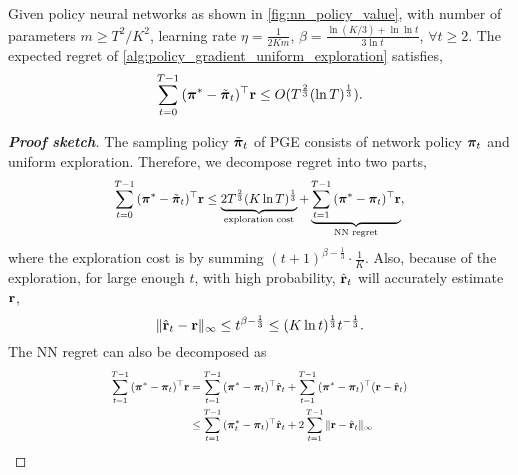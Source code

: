 \begin{thm}
	\label{thm:policy_gradient_main_result}
	Given policy neural networks as shown in \cref{fig:nn_policy_value}, with number of parameters $m \ge T^2 / K^2$, learning rate $\eta = \frac{1}{2 K m}$, $\beta = \frac{ \ln{(K/3) + \ln{\ln{t}} } }{ 3 \ln{t}}$, $\forall t \ge 2$. The expected regret of \cref{alg:policy_gradient_uniform_exploration} satisfies,
	\begin{equation*}
	\begin{split}
	\sum\limits_{t=0}^{T-1}{ ( {\boldsymbol{\pi}}^* - \tilde{{\boldsymbol{\pi}}}_t )^\top {\mathbf{r}}} \le O(T^{\frac{2}{3}}( \ln{T} )^{\frac{1}{3}}).
	\end{split}
	\end{equation*}
\end{thm}
\begin{proof}[\bf Proof sketch]
The sampling policy $\tilde{{\boldsymbol{\pi}}}_t$ of PGE consists of network policy ${\boldsymbol{\pi}}_t$ and uniform exploration. Therefore, we decompose regret into two parts,
\begin{equation}
 \label{eq:total_regret_decomposition}
 \scalemath{0.9}{
 \begin{split}
 \sum\limits_{t=0}^{T-1}{ ( \rvpi^* - \tilde{\rvpi}_t )^\top \rvr} \le \underbrace{ 2 T^{\frac{2}{3}} ( K \ln{T} )^{\frac{1}{3}} }_{\text{exploration cost}} + \underbrace{ \sum\limits_{t=1}^{T-1}{ ( {\rvpi^*} - \rvpi_t)^\top \rvr } }_{\text{NN regret}},
 \end{split}
 }
 \end{equation}
where the exploration cost is by summing $(t+1)^{ \beta - \frac{1}{3} }  \cdot \frac{1}{K}$. Also, because of the exploration, for large enough $t$, with high probability, $\hat{{\mathbf{r}}}_t$ will accurately estimate ${\mathbf{r}}$,
\begin{equation*}
    \| \hat{{\mathbf{r}}}_t - {\mathbf{r}} \|_\infty \le t^{\beta - \frac{1}{3}} \le ( K \ln{t} ) ^\frac{1}{3} t^{- \frac{1}{3}}.
\end{equation*}
The NN regret can also be decomposed as
\begin{equation}
\label{eq:playing_learning_phase_regret_decomposition}
\scalemath{0.78}{
\begin{split}
\sum\limits_{t=1}^{T-1}{ ( {\rvpi^*} - \rvpi_t )^\top \rvr}  &= \sum\limits_{t=1}^{T-1}{ ( {\rvpi^*} - \rvpi_t )^\top \hat{\rvr}_t } + \sum\limits_{t=1}^{T-1}{ ( {\rvpi^*} - \rvpi_t )^\top ( \rvr - \hat{\rvr}_t ) }\\
&\le \sum\limits_{t=1}^{T-1}{ ( {\rvpi_t^*} - \rvpi_t )^\top \hat{\rvr}_t  } + 2 \sum\limits_{t=1}^{T-1}{ \| \rvr - \hat{\rvr}_t \|_\infty } \\

\end{split}}
\end{equation}
\end{proof}
